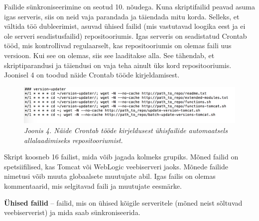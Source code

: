 \documentclass[12pt]{article}
\begin{document}
   Failide sünkroniseerimine on seotud 10. nõudega. Kuna skriptifailid peavad asuma igas serveris, siis on neid vaja parandada ja täiendada mitu korda. Selleks, et vältida töö dubleerimist, asuvad ühised failid (mis vastutavad loogika eest ja ei ole serveri seadistusfailid) repositooriumis. Igas serveris on seadistatud Crontab \cite{cron} tööd, mis kontrollivad regulaarselt, kas repositooriumis on olemas faili uus versioon. Kui see on olemas, siis see laaditakse alla. See tähendab, et skriptiparandusi ja täiendusi on vaja teha ainult üks kord repositooriumis. Joonisel 4 on toodud näide Crontab tööde kirjeldamisest.
   \begin{figure}[H]
     \begin{center} 
       \includegraphics[width=\textwidth]{screenshots/crontab.png}
       \caption*{\textit{Joonis 4. Näide Crontab tööde kirjeldusest ühisfailide automaatsels allalaadimiseks repositooriumist.}}
     \end{center}
   \end{figure}
  
  Skript koosneb 16 failist, mida võib jagada kolmeks grupiks. Mõned failid on spetsiifilised, kas Tomcat või WebLogic veebiserveri jaoks. Mõnede failide nimetusi võib muuta globaalsete muutujate abil. Igas failis on olemas kommentaarid, mis selgitavad faili ja muutujate eesmärke.

  \textbf{Ühised failid} \--- failid, mis on ühised kõigile serveritele (mõned neist sõltuvad veebiserverist) ja mida saab sünkroniseerida.
  
\end{document}
